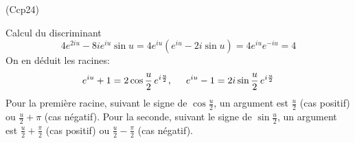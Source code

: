 \begin{tiny}(Ccp24)\end{tiny} \label{Ccp24}
Calcul du discriminant
\begin{displaymath}
  4e^{2iu}-8ie^{iu}\sin u = 4e^{iu}\left( e^{iu}-2i\sin u\right)
  = 4e^{iu}e^{-iu} = 4
\end{displaymath}
On en déduit les racines:
\begin{displaymath}
  e^{iu} +1 = 2\cos \frac{u}{2}\,e^{i\frac{u}{2}},\hspace{0.5cm}
  e^{iu} -1 = 2i\sin \frac{u}{2}\,e^{i\frac{u}{2}}
\end{displaymath}
Pour la première racine, suivant le signe de $\cos \frac{u}{2}$, un argument est $\frac{u}{2}$ (cas positif) ou $\frac{u}{2} +\pi$ (cas négatif). Pour la seconde, suivant le signe de $\sin \frac{u}{2}$, un argument est $\frac{u}{2}+\frac{\pi}{2}$ (cas positif) ou $\frac{u}{2}-\frac{\pi}{2}$ (cas négatif).
